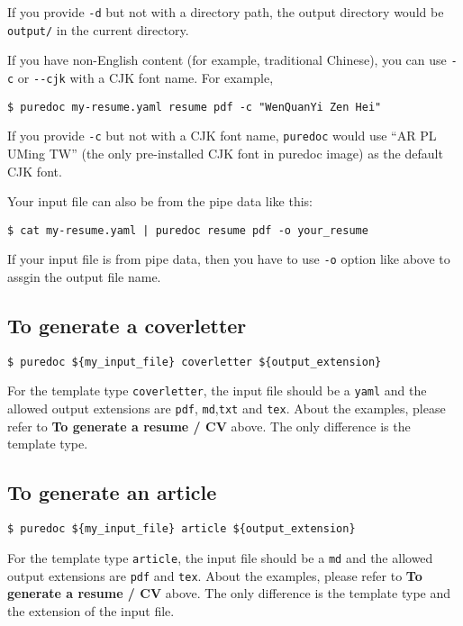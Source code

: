 \documentclass[10pt, a4paper, oneside]{article}
\begin{document}
If you provide \texttt{-d} but not with a directory path,
the output directory would be \texttt{output/} in the current directory.

If you have non-English content (for example, traditional Chinese), you can use \texttt{-c} or \texttt{-\/-cjk} with a CJK font name.
For example,

\begin{verbatim}
$ puredoc my-resume.yaml resume pdf -c "WenQuanYi Zen Hei" 
\end{verbatim}

If you provide \texttt{-c} but not with a CJK font name,
\texttt{puredoc} would use ``AR PL UMing TW'' (the only pre-installed CJK font in puredoc image) as the default CJK font.

Your input file can also be from the pipe data like this:

\begin{verbatim}
$ cat my-resume.yaml | puredoc resume pdf -o your_resume
\end{verbatim}

If your input file is from pipe data, then you have to use \texttt{-o} option like above to assgin the output file name.

\subsection{To generate a coverletter}\label{to-generate-a-coverletter}

\begin{verbatim}
$ puredoc ${my_input_file} coverletter ${output_extension}
\end{verbatim}

For the template type \texttt{coverletter},
the input file should be a \texttt{yaml} and
the allowed output extensions are \texttt{pdf}, \texttt{md},\texttt{txt} and \texttt{tex}.
About the examples, please refer to \textbf{To generate a resume / CV} above.
The only difference is the template type.

\subsection{To generate an article}\label{to-generate-an-article}

\begin{verbatim}
$ puredoc ${my_input_file} article ${output_extension}
\end{verbatim}

For the template type \texttt{article},
the input file should be a \texttt{md} and
the allowed output extensions are \texttt{pdf} and \texttt{tex}.
About the examples, please refer to \textbf{To generate a resume / CV} above.
The only difference is the template type and the extension of the input file.
\end{document}
